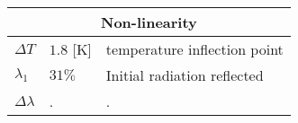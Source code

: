 \documentclass[../../main.tex]{subfiles}
\begin{document}
\begin{table}[htbp]
    \centering
    \begin{tabular}{|p{1cm}||p{4cm}|p{7cm}|}
        \hline
        \multicolumn{3}{|c|}{Non-linearity} \\
        \hline 
        $\Delta T$ & $1.8$ [K] & temperature inflection point \\
        $\lambda_1$ & $31\%$ & Initial radiation reflected \\
        $\Delta\lambda$ & . & . \\
        \hline
    \end{tabular}
\end{table}
\end{document}

